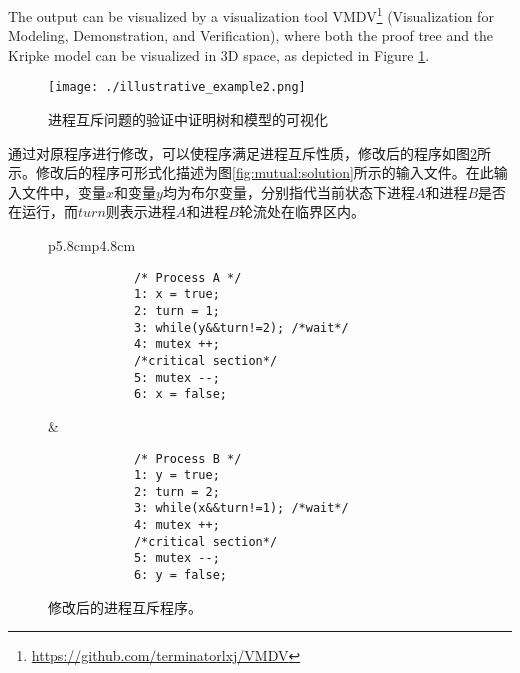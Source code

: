 \begin{example}
{	The output can be visualized by a visualization tool \textsf{VMDV}\footnote{\url{https://github.com/terminatorlxj/VMDV}} (Visualization for Modeling, Demonstration, and Verification), where both the proof tree and the Kripke model can be visualized in 3D space, as depicted in Figure \ref{fig:visualize:illustrative}.}
	\begin{figure}[!h]
		\centering
		\texttt{[image: ./illustrative\_example2.png]}
		\caption{进程互斥问题的验证中证明树和模型的可视化}
		\label{fig:visualize:illustrative}
	\end{figure}
	
	通过对原程序进行修改\cite{Peterson81}，可以使程序满足进程互斥性质，修改后的程序如图\ref{illustrative:mutual:solution}所示。修改后的程序可形式化描述为图\ref{fig:mutual:solution}所示的输入文件。在此输入文件中，变量$x$和变量$y$均为布尔变量，分别指代当前状态下进程$A$和进程$B$是否在运行，而$turn$则表示进程$A$和进程$B$轮流处在临界区内。
	
	\begin{figure}[!h]
		\centering
		\small
		\begin{tabular}{p{5.8cm}p{4.8cm}}
			\begin{verbatim}
			/* Process A */
			1: x = true;
			2: turn = 1;
			3: while(y&&turn!=2); /*wait*/
			4: mutex ++;
			/*critical section*/
			5: mutex --;
			6: x = false;
			\end{verbatim}
			&
			\begin{verbatim}
			/* Process B */
			1: y = true;
			2: turn = 2;
			3: while(x&&turn!=1); /*wait*/
			4: mutex ++;
			/*critical section*/
			5: mutex --;
			6: y = false;
			\end{verbatim}
		\end{tabular}
		
		\caption{修改后的进程互斥程序。}
		\label{illustrative:mutual:solution}	
	\end{figure}
	
	\begin{figure}[h!]
		\centering
		\scriptsize
			

\end{figure}
\end{example}
